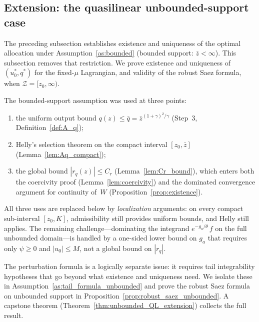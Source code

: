 \documentclass[12pt,a4paper]{article}
\theoremstyle{definition}
\theoremstyle{plain}
\theoremstyle{remark}
\newcommand{\zbar}{\bar{z}}
\newcommand{\zlow}{z_{\scriptscriptstyle 0}}
\newcommand{\calZ}{\mathcal{Z}}
\begin{document}

\subsection{Extension: the quasilinear unbounded-support case}
\label{sec:unbounded_QL}

The preceding subsection establishes existence and
uniqueness of the optimal allocation under
Assumption~\ref{as:bounded} (bounded support:
$\zbar < \infty$).  This subsection removes that
restriction.  We prove existence and uniqueness of
$(u_0^*, q^*)$ for the fixed-$\mu$ Lagrangian, and
validity of the robust Saez formula, when
$\calZ = [\zlow, \infty)$.

The bounded-support assumption was used at three points:
\begin{enumerate}[label=(\roman*)]
\item the uniform output bound
  $q(z) \leq \bar q = \zbar^{(1+\gamma)^2/\gamma}$
  (Step~3, Definition~\ref{def:A_q});
\item Helly's selection theorem on the compact interval
  $[\zlow, \zbar]$ (Lemma~\ref{lem:Aq_compact});
\item the global bound $|r_q(z)| \leq C_r$
  (Lemma~\ref{lem:Cr_bound}), which enters both the
  coercivity proof (Lemma~\ref{lem:coercivity}) and the
  dominated convergence argument for continuity of~$W$
  (Proposition~\ref{prop:existence}).
\end{enumerate}
All three uses are replaced below by \emph{localization}
arguments: on every compact sub-interval $[\zlow, K]$,
admissibility still provides uniform bounds, and Helly still
applies.  The remaining challenge---dominating the integrand
$e^{-g_a/\theta}\,f$ on the full unbounded
domain---is handled by a one-sided lower bound on $g_a$
that requires only $\psi \geq 0$ and $|u_0| \leq M$, not a
global bound on $|r_q|$.

The perturbation formula is a logically separate issue: it
requires tail integrability hypotheses that go beyond what
existence and uniqueness need.  We isolate these in
Assumption~\ref{as:tail_formula_unbounded} and prove the
robust Saez formula on unbounded support in
Proposition~\ref{prop:robust_saez_unbounded}.  A capstone
theorem (Theorem~\ref{thm:unbounded_QL_extension})
collects the full result.
\end{document}

